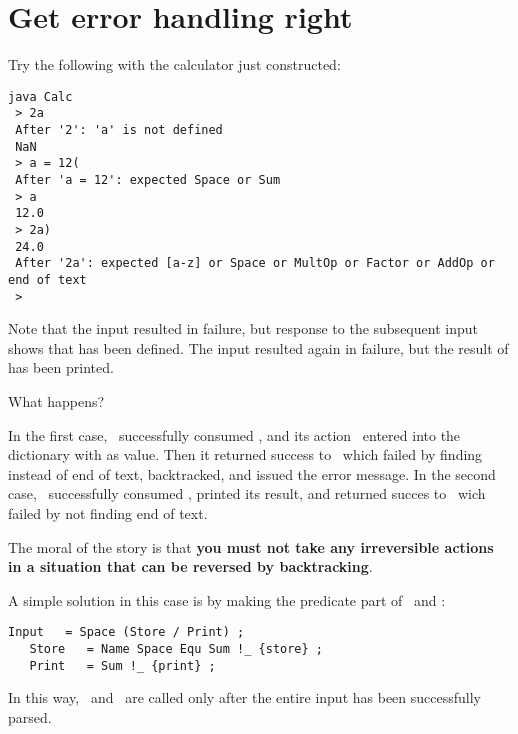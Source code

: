 
\section{Get error handling right\label{errors}}


Try the following with the calculator just constructed:

\small
\begin{Verbatim}[samepage=true,xleftmargin=15mm,baselinestretch=0.8]
 java Calc
 > 2a
 After '2': 'a' is not defined
 NaN
 > a = 12(
 After 'a = 12': expected Space or Sum
 > a
 12.0
 > 2a)
 24.0
 After '2a': expected [a-z] or Space or MultOp or Factor or AddOp or end of text
 > 
\end{Verbatim}
\normalsize

Note that the input  resulted in failure,
but response to the subsequent input  shows that 
has been defined.
The input  resulted again in failure,
but the result of  has been printed.

What happens?

In the first case, \Store\ successfully consumed ,
and its action \Storea\ entered  into the dictionary with  as value.
Then it returned success to \Input\, which failed by finding  instead of end of text,
backtracked, and issued the error message.
%
In the second case, \Print\ successfully consumed , printed its result,
and returned succes to \Input\, wich failed by not finding end of text.

The moral of the story is that \textbf{you must not take any irreversible actions
in a situation that can be reversed by backtracking}.

A simple solution in this case is by making the predicate  part 
of \Store\ and \Print:

\small
\begin{Verbatim}[frame=single,framesep=2mm,samepage=true,xleftmargin=15mm,xrightmargin=15mm,baselinestretch=0.8]
   Input   = Space (Store / Print) ;
   Store   = Name Space Equ Sum !_ {store} ;
   Print   = Sum !_ {print} ;
\end{Verbatim}
\normalsize

In this way, \Storea\ and \Printa\ are called only after the entire input
has been successfully parsed.

